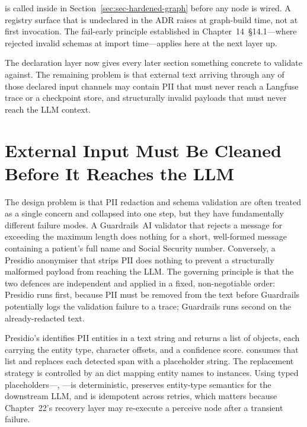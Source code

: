 \begin{notebox}
 is called inside
 in Section~\ref{sec:sec-hardened-graph}
before any  node is wired. A registry surface that is
undeclared in the ADR raises  at graph-build time,
not at first invocation. The fail-early principle established in
Chapter~14~\S14.1---where 
rejected invalid schemas at import time---applies here at the next
layer up.
\end{notebox}

The declaration layer now gives every later section something concrete
to validate against. The remaining problem is that external text
arriving through any of those declared input channels may contain PII
that must never reach a Langfuse trace or a checkpoint store, and
structurally invalid payloads that must never reach the LLM context.


\section{External Input Must Be Cleaned Before It Reaches the LLM}
\label{sec:sec-perceive}

The design problem is that PII redaction and schema validation are
often treated as a single concern and collapsed into one step, but they
have fundamentally different failure modes. A Guardrails~AI validator
that rejects a message for exceeding the maximum length does nothing
for a short, well-formed message containing a patient's full name and
Social Security number. Conversely, a Presidio anonymiser that strips
PII does nothing to prevent a structurally malformed payload from
reaching the LLM. The governing principle is that the two defences are
independent and applied in a fixed, non-negotiable order: Presidio
runs first, because PII must be removed from the text before Guardrails
potentially logs the validation failure to a trace; Guardrails runs
second on the already-redacted text.

Presidio's  identifies PII entities in a text
string and returns a list of  objects, each
carrying the entity type, character offsets, and a confidence score.
 consumes that list and replaces each detected
span with a placeholder string. The replacement strategy is controlled
by an  dict mapping entity names to
 instances. Using typed placeholders---,
---is deterministic, preserves entity-type
semantics for the downstream LLM, and is idempotent across retries,
which matters because Chapter~22's recovery layer may re-execute a
perceive node after a transient failure.


